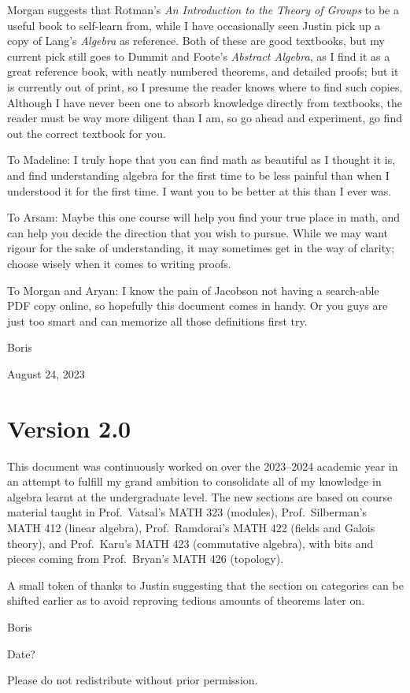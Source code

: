 Morgan suggests that Rotman's \textit{An Introduction to the Theory of Groups}
to be a useful book to self-learn from,
while I have occasionally seen Justin
pick up a copy of Lang's \textit{Algebra} as reference.
Both of these are good textbooks,
but my current pick still goes to Dummit and Foote's \textit{Abstract Algebra},
as I find it as a great reference book,
with neatly numbered theorems, and detailed proofs;
but it is currently out of print,
so I presume the reader knows where to find such copies.
Although I have never been one to absorb knowledge directly from textbooks,
the reader must be way more diligent than I am,
so go ahead and experiment,
go find out the correct textbook for you.

\medskip

To Madeline:
I truly hope that you can find math as beautiful as I thought it is,
and find understanding algebra for the first time
to be less painful than when I understood it for the first time.
I want you to be better at this than I ever was.

To Arsam:
Maybe this one course will help you find your true place in math,
and can help you decide the direction that you wish to pursue.
While we may want rigour for the sake of understanding,
it may sometimes get in the way of clarity;
choose wisely when it comes to writing proofs.

To Morgan and Aryan:
I know the pain of
Jacobson not having a search-able PDF copy online,
so hopefully this document comes in handy.
Or you guys are just too smart
and can memorize all those definitions first try.

\medskip

Boris

August 24, 2023

\section*{Version 2.0}

This document was continuously worked on
over the 2023--2024 academic year
in an attempt to fulfill my grand ambition
to consolidate all of my knowledge in algebra
learnt at the undergraduate level.
The new sections are based on course material taught in
Prof.\ Vatsal's MATH 323 (modules),
Prof.\ Silberman's MATH 412 (linear algebra),
Prof.\ Ramdorai's MATH 422 (fields and Galois theory),
and Prof.\ Karu's MATH 423 (commutative algebra),
with bits and pieces coming from Prof.\ Bryan's MATH 426 (topology).

A small token of thanks to Justin
suggesting that the section on categories can be shifted earlier
as to avoid reproving tedious amounts of theorems later on.

\medskip

Boris

Date?

\vspace{5mm}

Please do not redistribute without prior permission.
